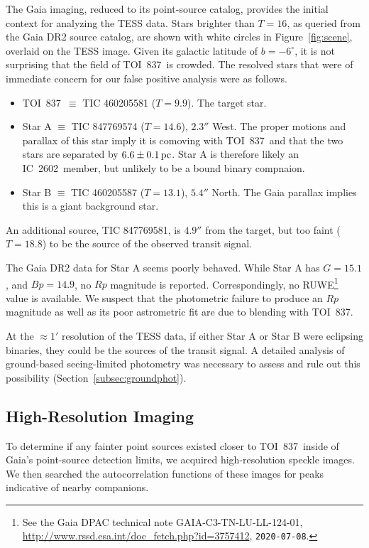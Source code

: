 \documentclass[12pt,twocolumn,tighten]{aastex63}
\newcommand{\tn}{TOI~837} %
\newcommand{\cn}{IC~2602} %
\begin{document}
The Gaia imaging, reduced to its point-source catalog, provides the
initial context for analyzing the TESS data.  Stars brighter than
$T=16$, as queried from the Gaia DR2 source catalog, are shown with
white circles in Figure~\ref{fig:scene}, overlaid on the TESS image.
Given its galactic latitude of $b=-6^\circ$, it is not surprising that
the field of \tn\ is crowded.  The resolved stars that were of
immediate concern for our false positive analysis were as follows.
\begin{itemize}
  \item \tn\ $\equiv$ TIC 460205581 ($T=9.9$). The target star.
  \item Star A $\equiv$ TIC 847769574 ($T=14.6$), $2.3''$ West. The
    proper motions and parallax of this star imply it is comoving with
    \tn\ and that the two stars are separated by $6.6\pm 0.1\,{\rm pc}$.
    Star A is therefore likely an \cn\ member, but unlikely to be a bound
    binary compnaion.
  \item Star B $\equiv$ TIC 460205587 ($T=13.1$), $5.4''$ North.  The
    Gaia parallax implies this is a giant background star.
\end{itemize}
An additional source, TIC 847769581, is $4.9''$ from the target, but
too faint ($T=18.8$) to be the source of the observed transit signal.

The Gaia DR2 data for Star A seems poorly behaved.  While Star A has
$G=15.1$, and $Bp=14.9$, no $Rp$ magnitude is reported.
Correspondingly, no RUWE\footnote{ See the Gaia DPAC technical note
GAIA-C3-TN-LU-LL-124-01,
\url{http://www.rssd.esa.int/doc_fetch.php?id=3757412},
\texttt{2020-07-08}. } value is available.  We suspect that the
photometric failure to produce an $Rp$ magnitude as well as its poor
astrometric fit are due to blending with \tn.

At the $\approx1'$ resolution of the TESS data, if either Star A or
Star B were eclipsing binaries, they could be the sources of the
transit signal.  A detailed analysis of ground-based seeing-limited
photometry was necessary to assess and rule out this possibility
(Section~\ref{subsec:groundphot}).


\subsection{High-Resolution Imaging}
\label{subsec:speckle}

To determine if any fainter point sources existed closer to \tn\
inside of Gaia's point-source detection limits, we acquired
high-resolution speckle images. We then searched the autocorrelation
functions of these images for peaks indicative of nearby companions.
\end{document}

